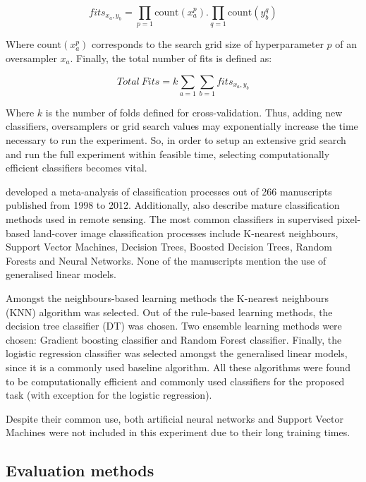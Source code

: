 \documentclass[parskip=full]{scrartcl}
\begin{document}
\[
fits_{x_a,y_b}=\prod\limits_{p=1} \textrm{count}(x_a^p).\prod\limits_{q=1}
\textrm{count}(y_b^q)
\]

Where $\textrm{count}(x_a^p)$ corresponds to the search grid size of
hyperparameter $p$ of an oversampler $x_a$. Finally, the total number of fits
is defined as:

\[
Total\ Fits=k\sum\limits_{a=1} \sum\limits_{b=1} fits_{x_a,y_b}
\]

Where $k$ is the number of folds defined for cross-validation. Thus, adding new
classifiers, oversamplers or grid search values may exponentially increase the
time necessary to run the experiment. So, in order to setup an extensive grid
search and run the full experiment within feasible time, selecting
computationally efficient classifiers becomes vital.

\cite{Khatami2016} developed a meta-analysis of classification processes out
of 266 manuscripts published from 1998 to 2012. Additionally,
\cite{Maxwell2018} also describe mature classification methods used in remote
sensing. The most common classifiers in supervised pixel-based land-cover image
classification processes include K-nearest neighbours, Support Vector Machines,
Decision Trees, Boosted Decision Trees, Random Forests and Neural Networks.
None of the manuscripts mention the use of generalised linear models.

Amongst the neighbours-based learning methods the K-nearest neighbours (KNN)
algorithm was selected. Out of the rule-based learning methods, the decision
tree classifier (DT) was chosen. Two ensemble learning methods were chosen:
Gradient boosting classifier and Random Forest classifier. Finally, the
logistic regression classifier was selected amongst the generalised linear
models, since it is a commonly used baseline algorithm. All these algorithms
were found to be computationally efficient and commonly used classifiers for
the proposed task (with exception for the logistic regression).

Despite their common use, both artificial neural networks and Support
Vector Machines were not included in this experiment due to their long training
times.

\subsection{Evaluation methods}
\end{document}
